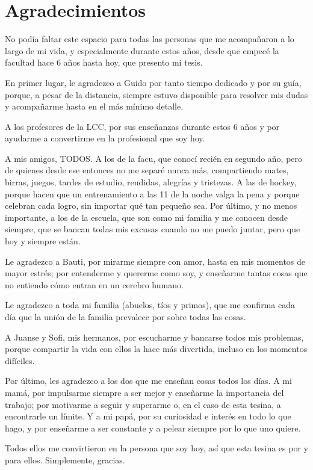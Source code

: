\documentclass[a4paper,	11pt]{report}
\begin{document}
\chapter*{Agradecimientos}
No podía faltar este espacio para todas las personas que me acompañaron a lo largo de mi vida,
y especialmente durante estos años,
desde que empecé la facultad hace 6 años hasta hoy,
que presento mi tesis.

En primer lugar,
le agradezco a Guido por tanto tiempo dedicado y por su guía,
porque,
a pesar de la distancia,
siempre estuvo disponible para resolver mis dudas y acompañarme hasta en el más mínimo detalle.

A los profesores de la LCC,
por sus enseñanzas durante estos 6 años y por ayudarme a convertirme en la profesional que soy hoy.

A mis amigos, TODOS.
A los de la facu,
que conocí recién en segundo año,
pero de quienes desde ese entonces no me separé nunca más,
compartiendo mates, birras, juegos, tardes de estudio, rendidas, alegrías y tristezas.
A las de hockey,
porque hacen que un entrenamiento a las 11 de la noche valga la pena y porque celebran cada logro,
sin importar qué tan pequeño sea.
Por último,
y no menos importante,
a los de la escuela,
que son como mi familia y me conocen desde siempre,
que se bancan todas mis excusas cuando no me puedo juntar,
pero que hoy y siempre están.

Le agradezco a Bauti,
por mirarme siempre con amor,
hasta en mis momentos de mayor estrés;
por entenderme y quererme como soy,
y enseñarme tantas cosas que no entiendo cómo entran en un cerebro humano.

Le agradezco a toda mi familia
(abuelos, tíos y primos),
que me confirma cada día que la unión de la familia prevalece por sobre todas las cosas.

A Juanse y Sofi,
mis hermanos,
por escucharme y bancarse todos mis problemas,
porque compartir la vida con ellos la hace más divertida,
incluso en los momentos difíciles.

Por último,
les agradezco a los dos que me enseñan cosas todos los días.
A mi mamá,
por impulsarme siempre a ser mejor y enseñarme la importancia del trabajo;
por motivarme a seguir y superarme o,
en el caso de esta tesina,
a encontrarle un límite.
Y a mi papá,
por su curiosidad e interés en todo lo que hago,
y por enseñarme a ser constante y a pelear siempre por lo que uno quiere.

Todos ellos me convirtieron en la persona que soy hoy,
así que esta tesina es por y para ellos.
Simplemente,
gracias.
\end{document}
